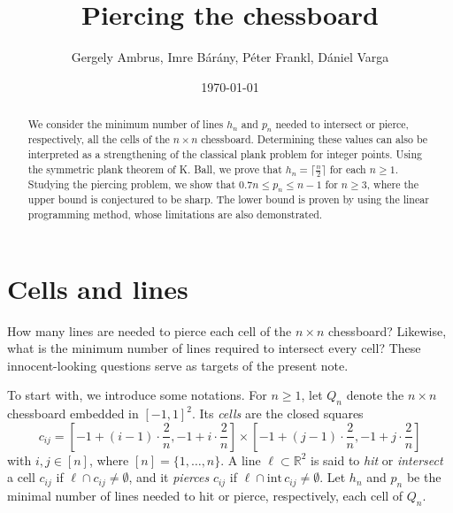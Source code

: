 \documentclass[11pt,a4paper]{amsart}
\author{Gergely Ambrus, Imre Bárány, Péter Frankl, Dániel Varga}
\title{Piercing the chessboard}
\date{\today}
\newcommand{\R}{\mathbb{R}}
\begin{document}
\maketitle


\begin{abstract}
We consider the minimum number of lines $h_n$ and $p_n$ needed to intersect or pierce, respectively, all the cells of the $n \times n$ chessboard. Determining these values can also be interpreted as a strengthening of the classical plank problem for integer points.  Using the symmetric plank theorem of K. Ball, we prove that $h_n = \lceil \frac n 2 \rceil$ for each $n \geq 1$. Studying the piercing problem, we show that $0.7n \leq  p_n \leq n-1$ for $n\geq 3$, where the upper bound is conjectured to be sharp. The lower bound is proven by using the linear programming method, whose limitations are also demonstrated.
\end{abstract}


\maketitle



\section{Cells and lines}
How many lines are needed to pierce each cell of the $n \times n$ chessboard? Likewise, what is the minimum number of lines required to intersect every cell? These innocent-looking questions serve as targets of the present note.



To start with, we introduce some notations. For $ n \geq 1$, let $Q_n$ denote the $n \times n$ chessboard embedded in $[-1,1]^2$. Its {\em cells} are the closed squares
\begin{equation}\label{cijdef}
c_{ij} = \left[ -1 + (i-1)\cdot \frac 2 n , -1 + i \cdot \frac 2 n\right] \times  \left[-1 + (j-1) \cdot \frac 2 n , -1 + j  \cdot \frac 2 n \right]
\end{equation}
with $i, j \in [n]$, where $[n] = \{ 1, \ldots, n \}$. A line $\ell \subset \R^2$ is said to {\em hit} or {\em intersect} a cell $c_{ij}$ if $\ell \cap  c_{ij} \neq \emptyset$, and it {\em pierces} $c_{ij}$ if $\ell \cap  \textrm{int} \, c_{ij} \neq \emptyset$. Let $h_n$ and $p_n$ be the minimal number of lines needed to hit or pierce, respectively,  each cell of $Q_n$.
\end{document}
